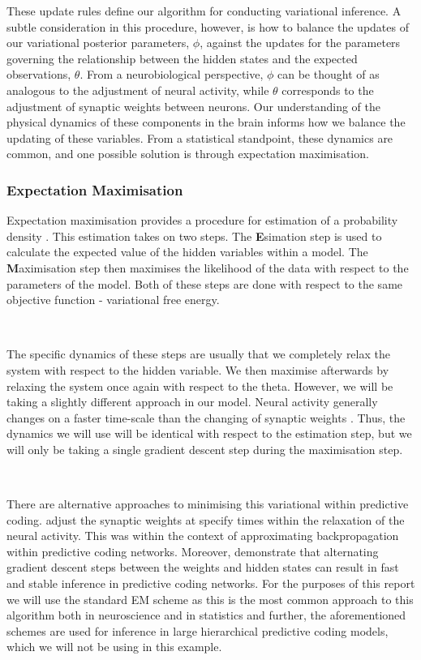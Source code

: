 \documentclass{article}
\begin{document}
These update rules define our algorithm for conducting variational inference. A subtle consideration in this procedure, however, is how to balance the updates of our variational posterior parameters, $\phi$, against the updates for the parameters governing the relationship between the hidden states and the expected observations, $\theta$. From a neurobiological perspective, $\phi$ can be thought of as analogous to the adjustment of neural activity, while $\theta$ corresponds to the adjustment of synaptic weights between neurons. Our understanding of the physical dynamics of these components in the brain informs how we balance the updating of these variables. From a statistical standpoint, these dynamics are common, and one possible solution is through expectation maximisation.



\subsubsection{Expectation Maximisation}

Expectation maximisation provides a procedure for estimation of a probability density \citep{friston2003learning}. This estimation takes on two steps. The \textbf{E}simation step is used to calculate the expected value of the hidden variables within a model. The \textbf{M}aximisation step then maximises the likelihood of the data with respect to the parameters of the model. Both of these steps are done with respect to the same objective function - variational free energy. \citep{friston2003learning}

\

The specific dynamics of these steps are usually that we completely relax the system with respect to the hidden variable. We then maximise afterwards by relaxing the system once again with respect to the theta. However, we will be taking a slightly different approach in our model. Neural activity generally changes on a faster time-scale than the changing of synaptic weights \citep{millidge2024temporal}. Thus, the dynamics we will use will be identical with respect to the estimation step, but we will only be taking a single gradient descent step during the maximisation step.

\

There are alternative approaches to minimising this variational within predictive coding. \citet{song2020can} adjust the synaptic weights at specify times within the relaxation of the neural activity. This was within the context of approximating backpropagation within predictive coding networks. Moreover, \citet{salvatori2024a} demonstrate that alternating gradient descent steps between the weights and hidden states can result in fast and stable inference in predictive coding networks. For the purposes of this report we will use the standard EM scheme as this is the most common approach to this algorithm both in neuroscience and in statistics and further, the aforementioned schemes are used for inference in large hierarchical predictive coding models, which we will not be using in this example. 
\end{document}
